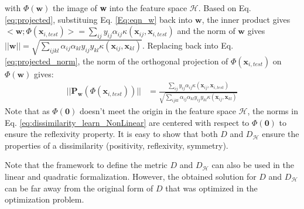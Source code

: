 \noindent with $\Phi(\textbf{w})$ the image of \textbf{w} into the feature space $\mathcal{H}$. Based on Eq. \ref{eq:projected}, substituing Eq. \ref{Eq:eqn_w} back into $\textbf{w}$, the inner product gives $<\textbf{w};\Phi(\textbf{x}_{i,test})> = \sum_{ij} y_{ij} \alpha_{ij} \kappa(\textbf{x}_{ij},\textbf{x}_{i,test})$ and the norm of $\textbf{w}$ gives $||\textbf{w}||= \sqrt{\sum_{ijkl} \alpha_{ij} \alpha_{kl} y_{ij} y_{kl} \kappa(\textbf{x}_{ij},\textbf{x}_{kl})}$. Replacing back into Eq. \ref{eq:projected_norm}, the norm of the orthogonal projection of $\Phi(\textbf{x}_{i,test})$ on $\Phi(\textbf{w})$ gives:
\begin{align}
||\textbf{P}_\textbf{w}(\Phi(\textbf{x}_{i,test}))|| & = \frac
{\sum_{ij} y_{ij} \alpha_{ij} \kappa(\textbf{x}_{ij},\textbf{x}_{i,test})}
{\sqrt{\sum_{ijkl} \alpha_{ij} \alpha_{kl} y_{ij} y_{kl}
		\kappa(\textbf{x}_{ij},\textbf{x}_{kl})
	}}
\end{align}
Note that as $\Phi(\textbf{0})$ doesn’t meet the origin in the feature space $\mathcal{H}$, the norms in Eq. \ref{eq:dissimilarity_learn_NonLinear} are centered with respect to $\Phi(\textbf{0})$ to ensure the reflexivity property. 
It is easy to show that both $D$ and $D_\mathcal{H}$ ensure the properties of a dissimilarity (positivity, reflexivity, symmetry).

Note that the framework to define the metric $D$ and $D_\mathcal{H}$ can also be used in the linear and quadratic formalization. However, the obtained solution for $D$ and $D_\mathcal{H}$ can be far away from the original form of $D$ that was optimized in the optimization problem.



